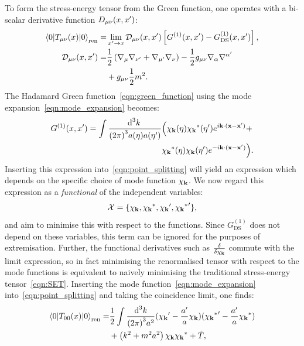 To form the stress-energy tensor from the Green function, one operates with a bi-scalar derivative function $D_{\mu\nu}(x,\prm{x})$:
\begin{align}
  \bracket{0}{T_{\mu\nu}(x)}{0}_\mathrm{ren} =& \lim\limits_{\prm{x}\to x} \mathcal{D}_{\mu\nu}(x,\prm{x}) \left[ G^{(1)}(x,\prm{x}) - G^{(1)}_\mathrm{DS}(x,\prm{x}) \right],
  \label{eqn:point_splitting}
  \\
  \mathcal{D}_{\mu\nu}(x,\prm{x})=& \frac{1}{2}\left( \nabla_{\mu}\nabla_{\prm{\nu}} + \nabla_{\prm{\mu}}\nabla_{\nu} \right) -\frac{1}{2} g_{\mu\nu} \nabla_\alpha \nabla^{\prm{\alpha}} \nonumber\\
  &+ g_{\mu\nu} \frac{1}{2}m^2.  \nonumber
\end{align}
The Hadamard Green function~\eqref{eqn:green_function} using the mode expansion~\eqref{eqn:mode_expansion} becomes:
\begin{align}
  G^{(1)}(x,\prm{x}) = 
  \int\frac{\d[3]{k}\:}{{(2\pi)}^3a(\eta)a(\prm{\eta})}&
  \Big(
  \chi_\vk(\eta)
  \str{\chi_{\vk}}(\prm{\eta})e^{i\vk\cdot(\vx-\prm{\vx})}+\nonumber\\
  &
  \str{\chi_\vk}(\eta)
  \chi_{\vk}(\prm{\eta})e^{-i\vk\cdot(\vx-\prm{\vx})}
  \Big).
  \nonumber
\end{align}
Inserting this expression into~\eqref{eqn:point_splitting} will yield an expression which depends on the specific choice of mode function $\chi_\vk$. We now regard this expression as a {\em functional\/} of the independent variables:
\begin{equation}
  \mathcal{X} = \{\chi_\vk,\str{\chi_\vk},\prm{\chi_\vk},\prm{\str{\chi_\vk}}\},
  \label{eqn:vars}
\end{equation}
and aim to minimise this with respect to the functions. Since $G^{(1)}_{\mathrm{DS}}$ does not depend on these variables, this term can be ignored for the purposes of extremisation. Further, the functional derivatives such as $\frac{\delta}{\delta \chi_\vk}$ commute with the limit expression, so in fact minimising the renormalised tensor with respect to the mode functions is equivalent to naively minimising the traditional stress-energy tensor~\eqref{eqn:SET}. Inserting the mode function~\eqref{eqn:mode_expansion} into~\eqref{eqn:point_splitting} and taking the coincidence limit, one finds:
\begin{align}
  \bracket{0}{T_{00}(x)}{0}_\mathrm{ren} = &\frac{1}{2}\int \frac{\d[3]{k}}{{(2\pi)}^3 a^2} (\prm{\chi_\vk}-\frac{\prm{a}}{a}\chi_\vk)(\prm{\str{\chi_\vk}}-\frac{\prm{a}}{a}\str{\chi_\vk})
  \nonumber \\
  &+\left( k^2 + m^2a^2 \right)\chi_\vk {\chi_\vk}^\ast + \tilde{T},
\end{align}
